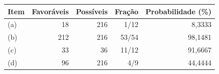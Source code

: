 \begin{tabular}{lrrrr}
\toprule
Item & Favoráveis & Possíveis & Fração & Probabilidade (\%) \\
\midrule
(a) & 18 & 216 & 1/12 & 8,3333 \\
(b) & 212 & 216 & 53/54 & 98,1481 \\
(c) & 33 & 36 & 11/12 & 91,6667 \\
(d) & 96 & 216 & 4/9 & 44,4444 \\
\bottomrule
\end{tabular}
